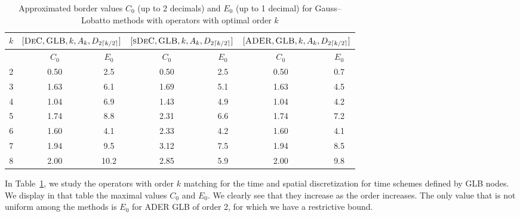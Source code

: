 \begin{table}
	\centering
	\caption{Approximated border values $C_0$ (up to 2 decimals) and $E_0$ (up to 1 decimal) for Gauss--Lobatto methods with operators with optimal order $k$}\label{tab:CE_values}
	\begin{tabular}{|c||c|c||c|c||c|c|}\hline
				$k$&
		\multicolumn{2}{|c||}{$[\textsc{DeC},\textsc{GLB},k,A_k,D_{2\lceil k/2 \rceil}]$}&
		\multicolumn{2}{|c||}{$[\textsc{sDeC},\textsc{GLB},k,A_k,D_{2\lceil k/2 \rceil}]$}&
		\multicolumn{2}{|c|}{$[\textsc{ADER},\textsc{GLB},k,A_k,D_{2\lceil k/2 \rceil}]$}\\\hline
		&$\qquad C_0\qquad$&$E_0$&$\qquad C_0\qquad$&$E_0$&$\qquad C_0\qquad$&$E_0$\\\hline
		2& 0.50 &2.5&0.50&2.5&0.50&0.7\\
		3& 1.63 &6.1&1.69&5.1&1.63&4.5\\
		4& 1.04&6.9&1.43&4.9&1.04&4.2\\
		5& 1.74&8.8&2.31&6.6&1.74&7.2\\
		6& 1.60&4.1&2.33&4.2&1.60&4.1\\
		7& 1.94&9.5&3.12&7.5&1.94&8.5\\
		8&2.00&10.2&2.85&5.9&2.00&9.8\\ \hline
	\end{tabular}
\end{table}

In Table~\ref{tab:CE_values}, we study the operators with order $k$ matching for the time and spatial discretization for time schemes defined by GLB nodes. We display in that table the maximal values $C_0$ and $E_0$. 
We clearly see that they increase as the order increases. 
The only value that is not uniform among the methods is $E_0$ for ADER GLB of order 2, for which we have a restrictive bound.